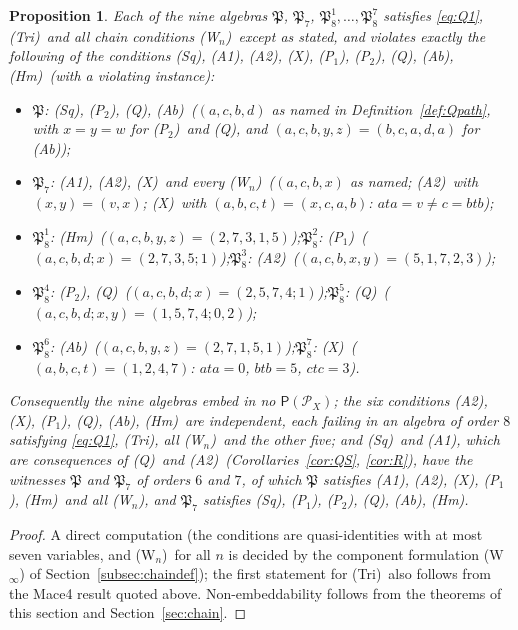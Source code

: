 \documentclass[11pt]{amsart}
\newtheorem{proposition}[theorem]{Proposition}
\theoremstyle{definition}
\renewcommand{\P}{\mathcal{P}}      %
\newcommand{\PA}{\mathsf{P}}         %
\newcommand{\Tri}{\textup{(Tri)}}
\newcommand{\Wire}{\textup{(Sq)}}      %
\newcommand{\Rcond}{\textup{(A1)}}     %
\newcommand{\Rp}{\textup{(A2)}}        %
\newcommand{\Vcond}{\textup{(X)}}      %
\newcommand{\Pone}{\textup{(P$_1$)}}
\newcommand{\Ptwo}{\textup{(P$_2$)}}
\newcommand{\Qcond}{\textup{(Q)}}
\newcommand{\Kzero}{\textup{(Hm)}}     %
\newcommand{\Kfour}{\textup{(Ab)}}     %
\newcommand{\Wn}[1][n]{\textup{(W$_{#1}$)}}
\begin{document}
\begin{proposition}\label{prop:witnesses}
Each of the nine algebras $\mathfrak P$, $\mathfrak P_7$, $\mathfrak P_8^1,\dots,\mathfrak P_8^7$ satisfies \eqref{eq:Q1}, \Tri\ and all chain conditions \Wn\ except as stated, and violates exactly the following of the conditions \Wire, \Rcond, \Rp, \Vcond, \Pone, \Ptwo, \Qcond, \Kfour, \Kzero\ (with a violating instance):
\begin{itemize}[nosep]
\item $\mathfrak P$: \Wire, \Ptwo, \Qcond, \Kfour\ ($(a,c,b,d)$ as named in Definition~\ref{def:Qpath}, with $x=y=w$ for \Ptwo\ and \Qcond, and $(a,c,b,y,z)=(b,c,a,d,a)$ for \Kfour);
\item $\mathfrak P_7$: \Rcond, \Rp, \Vcond\ and every \Wn\ ($(a,c,b,x)$ as named; \Rp\ with $(x,y)=(v,x)$; \Vcond\ with $(a,b,c,t)=(x,c,a,b)$: $ata=v\ne c=btb$);
\item $\mathfrak P_8^1$: \Kzero\ ($(a,c,b,y,z)=(2,7,3,1,5)$);\quad $\mathfrak P_8^2$: \Pone\ ($(a,c,b,d;x)=(2,7,3,5;1)$);\quad $\mathfrak P_8^3$: \Rp\ ($(a,c,b,x,y)=(5,1,7,2,3)$);
\item $\mathfrak P_8^4$: \Ptwo, \Qcond\ ($(a,c,b,d;x)=(2,5,7,4;1)$);\quad $\mathfrak P_8^5$: \Qcond\ ($(a,c,b,d;x,y)=(1,5,7,4;0,2)$);
\item $\mathfrak P_8^6$: \Kfour\ ($(a,c,b,y,z)=(2,7,1,5,1)$);\quad $\mathfrak P_8^7$: \Vcond\ ($(a,b,c,t)=(1,2,4,7)$: $ata=0$, $btb=5$, $ctc=3$).
\end{itemize}
Consequently the nine algebras embed in no $\PA(\P_X)$; the six conditions \Rp, \Vcond, \Pone, \Qcond, \Kfour, \Kzero\ are independent, each failing in an algebra of order $8$ satisfying \eqref{eq:Q1}, \Tri, all \Wn\ and the other five; and \Wire\ and \Rcond, which are consequences of \Qcond\ and \Rp\ (Corollaries~\ref{cor:QS}, \ref{cor:R}), have the witnesses $\mathfrak P$ and $\mathfrak P_7$ of orders $6$ and $7$, of which $\mathfrak P$ satisfies \Rcond, \Rp, \Vcond, \Pone, \Kzero\ and all \Wn, and $\mathfrak P_7$ satisfies \Wire, \Pone, \Ptwo, \Qcond, \Kfour, \Kzero.
\end{proposition}

\begin{proof}
A direct computation (the conditions are quasi-identities with at most seven variables, and \Wn\ for all $n$ is decided by the component formulation (W$_\infty$) of Section~\ref{subsec:chaindef}); the first statement for \Tri\ also follows from the Mace4 result quoted above. Non-embeddability follows from the theorems of this section and Section~\ref{sec:chain}.
\end{proof}
\end{document}
